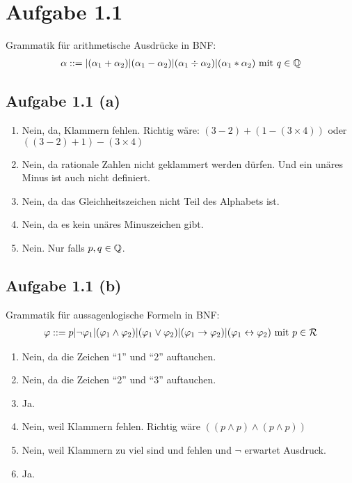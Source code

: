 \documentclass[12pt,a4paper]{article}
\author{Willi Sontopski}
\begin{document}

\section*{Aufgabe 1.1}
Grammatik für arithmetische Ausdrücke in BNF:
\begin{align*}
\alpha::=|(\alpha_1+\alpha_2)|(\alpha_1-\alpha_2)|(\alpha_1\div\alpha_2)|(\alpha_1\ast\alpha_2)\mit q\in\Q
\end{align*}
\subsection*{Aufgabe 1.1 (a)}
\begin{enumerate}[label=(\arabic*)]
\item  Nein, da, Klammern fehlen. Richtig wäre: $(3-2)+(1-(3\times 4))$ oder $((3-2)+1)-(3\times 4)$
\item Nein, da rationale Zahlen nicht geklammert werden dürfen. Und ein unäres Minus ist auch nicht definiert.
\item Nein, da das Gleichheitszeichen nicht Teil des Alphabets ist.
\item Nein, da es kein unäres Minuszeichen gibt.
\item Nein. Nur falls $p,q\in\Q$.
\end{enumerate}

\subsection*{Aufgabe 1.1 (b)}
Grammatik für aussagenlogische Formeln in BNF:
\begin{align*}
\varphi::=p|\neg \varphi_1|(\varphi_1\wedge\varphi_2)|(\varphi_1\vee\varphi_2)|(\varphi_1\to\varphi_2)|(\varphi_1\leftrightarrow\varphi_2)\mit p\in\mathcal{R}
\end{align*}
\begin{enumerate}[label=(\arabic*)]
\item Nein, da die Zeichen ``1'' und ``2'' auftauchen.
\item Nein, da die Zeichen ``2'' und ``3'' auftauchen.
\item Ja.
\item Nein, weil Klammern fehlen. Richtig wäre $((p\wedge p)\wedge(p\wedge p))$
\item Nein, weil Klammern zu viel sind und fehlen und $\neg$ erwartet Ausdruck.
\item Ja.
\end{enumerate}
\end{document}
